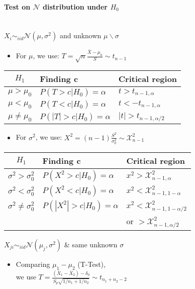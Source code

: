 \documentclass[paper=a4,fontsize=8pt,pagesize,DIV=calc]{scrartcl}
\begin{document}
\begin{multicols}{3}
\paragraph{Test on $\mathcal{N}$ distribution under $H_0$} ~~\\
$X_i\sim_{iid}\mathcal{N}(\mu,\sigma^2)$ and unknown $\mu\backslash\sigma$
\begin{itemize}
\item For $\mu$, we use: $T=\sqrt{n}\frac{\bar{X}-\mu_0}{S}\sim t_{n-1}$\\
\end{itemize}
\vspace*{-.7\baselineskip}
\begin{tabular}{|c|l|l|}
\hline
$H_1$&Finding c &Critical region\\
\hline
$\mu>\mu_0$ & $P(T>c|H_0)=\alpha$&$t>t_{n-1,\alpha}$\\
$\mu<\mu_0$ & $P(T<c|H_0)=\alpha$&$t<-t_{n-1,\alpha}$\\
$\mu\neq\mu_0$ & $P(|T|>c|H_0)=\alpha$&$|t|>t_{n-1,\alpha/2}$\\
\hline
\end{tabular}
\begin{itemize}
\item For $\sigma^2$, we use: $X^2=(n-1)\frac{S^2}{\sigma^2_0}\sim \mathcal{X}^2_{n-1}$\\
\end{itemize}
\vspace*{-.3\baselineskip}
\begin{tabular}{|c|l|l|}
\hline
$H_1$&Finding c &Critical region\\
\hline
$\sigma^2>\sigma^2_0$ & $P(X^2>c|H_0)=\alpha$& $x^2>\mathcal{X}^2_{n-1,\alpha}$\\
$\sigma^2<\sigma^2_0$ & $P(X^2<c|H_0)=\alpha$& $x^2<\mathcal{X}^2_{n-1,1-\alpha}$\\
$\sigma^2\neq\sigma^2_0$ & $P(|X^2|>c|H_0)=\alpha$& $x^2<\mathcal{X}^2_{n-1,1-\alpha/2}$ \\
&&or $>\mathcal{X}^2_{n-1,\alpha/2}$\\
\hline
\end{tabular}
\vspace{0.1cm}
$X_{ji}\sim_{iid}\mathcal{N}(\mu_j,\sigma^2)$ \& same unknown $\sigma$
\begin{itemize}
\item Comparing $\mu_1-\mu_2$ (T-Test), \\we use $T=\frac{(\bar{X}_1-\bar{X}_2)-\delta_0}{S_p\sqrt{1/n_1+1/n_2}}\sim t_{n_1+n_2-2}$
\end{itemize}

\end{multicols}
\end{document}
